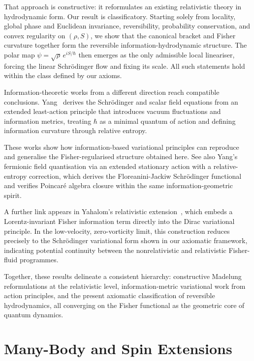 \documentclass[11pt,a4paper]{article}
\numberwithin{equation}{section}
\theoremstyle{thmcompact}
\theoremstyle{remark}
\begin{document}
That approach is constructive: it reformulates an existing relativistic theory in hydrodynamic form.  
Our result is classificatory.  
Starting solely from locality, global phase and Euclidean invariance, reversibility, probability conservation, and convex regularity on $(\rho,S)$, we show that the canonical bracket and Fisher curvature together form the reversible information-hydrodynamic structure.  
The polar map $\psi=\sqrt{\rho}\,e^{iS/\hbar}$ then emerges as the only admissible local lineariser, forcing the linear Schrödinger flow and fixing its scale. All such statements hold within the class defined by our axioms.

Information-theoretic works from a different direction reach compatible conclusions.  
Yang~\cite{Yang2024Vacuum,Yang2024Scalar} derives the Schrödinger and scalar field equations from an extended least-action principle that introduces vacuum fluctuations and information metrics, treating $\hbar$ as a minimal quantum of action and defining information curvature through relative entropy.  

These works show how information-based variational principles can reproduce and generalise the Fisher-regularised structure obtained here. See also Yang’s fermionic field quantisation via an extended stationary action with a relative-entropy correction, which derives the Floreanini-Jackiw Schrödinger functional and verifies Poincaré algebra closure within the same information-geometric spirit.

A further link appears in Yahalom’s relativistic extension~\cite{Yahalom2024Dirac}, which embeds a Lorentz-invariant Fisher information term directly into the Dirac variational principle.  
In the low-velocity, zero-vorticity limit, this construction reduces precisely to the Schrödinger variational form shown in our axiomatic framework, indicating potential continuity between the nonrelativistic and relativistic Fisher-fluid programmes.

Together, these results delineate a consistent hierarchy: constructive Madelung reformulations at the relativistic level, information-metric variational work from action principles, and the present axiomatic classification of reversible hydrodynamics, all converging on the Fisher functional as the geometric core of quantum dynamics.

	\section{Many-Body and Spin Extensions}
	
\end{document}

